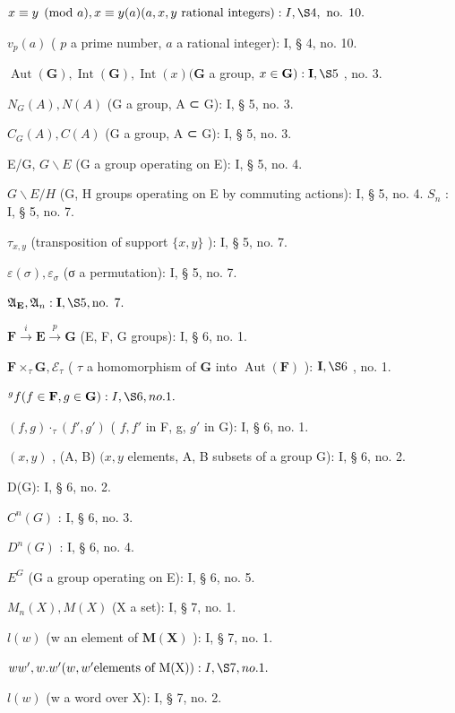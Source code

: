 \(x \equiv y \pmod{a}, x \equiv y (a) (a, x, y \text{ rational integers}) : I, \S 4, \text{ no. } 10.\)

\(v_{p}(a)\) ( \(p\) a prime number, \(a\) a rational integer): I, § 4, no. 10.

\(\operatorname{Aut}(\mathbf{G}), \operatorname{Int}(\mathbf{G}), \operatorname{Int}(x) (\mathbf{G}\) a group, \(x \in \mathbf{G}) : \mathbf{I}, \S 5\) , no. 3.

\(N_{G}(A), N(A)\) (G a group, A ⊂ G): I, § 5, no. 3.

\(C_{G}(A), C(A)\) (G a group, A ⊂ G): I, § 5, no. 3.

E/G, \(G\backslash E\) (G a group operating on E): I, § 5, no. 4.

\(G\backslash E/H\) (G, H groups operating on E by commuting actions): I, § 5, no. 4. \(S_{n}\) : I, § 5, no. 7.

\(\tau_{x,y}\) (transposition of support \(\{x,y\}\) ): I, § 5, no. 7.

\(\varepsilon (\sigma),\varepsilon_{\sigma}\) (σ a permutation): I, § 5, no. 7.

\(\mathfrak{A}_{\mathbf{E}}, \mathfrak{A}_n: \mathbf{I}, \S 5, \text{no. } 7.\)

\(\mathbf{F} \xrightarrow{i} \mathbf{E} \xrightarrow{p} \mathbf{G}\) (E, F, G groups): I, § 6, no. 1.

\(\mathbf{F} \times_{\tau} \mathbf{G}, \mathcal{E}_{\tau}\) ( \(\tau\) a homomorphism of \(\mathbf{G}\) into \(\operatorname{Aut}(\mathbf{F})\) ): \(\mathbf{I}, \S 6\) , no. 1.

\(^{g}f(f\in\mathbf{F},g\in\mathbf{G}):I,\S6,no.1.\)

\((f,g)\cdot_{\tau}(f',g')\) ( \(f,f'\) in F, g, \(g'\) in G): I, § 6, no. 1.

\((x,y)\) , (A, B) \((x,y\) elements, A, B subsets of a group G): I, § 6, no. 2.

D(G): I, § 6, no. 2.

\(C^{n}(G)\) : I, § 6, no. 3.

\(D^{n}(G)\) : I, § 6, no. 4.

\(E^{G}\) (G a group operating on E): I, § 6, no. 5.

\(M_{n}(X), M(X)\) (X a set): I, § 7, no. 1.

\(l(w)\) (w an element of \(\mathbf{M}(\mathbf{X})\) ): I, § 7, no. 1.

\(ww', w.w' (w, w'\text{elements of M(X)}): I, \S 7, no. 1.\)

\(l(w)\) (w a word over X): I, § 7, no. 2.

